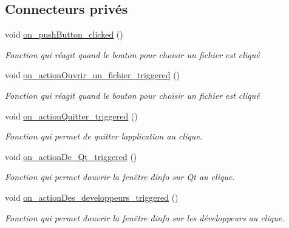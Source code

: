 \subsection*{Connecteurs privés}
\begin{DoxyCompactItemize}
\item 
void \hyperlink{classMainWindowLaunchDialog_a4464510ed5080984f0af0d3c0559f9eb}{on\+\_\+push\+Button\+\_\+clicked} ()
\begin{DoxyCompactList}\small\item\em Fonction qui réagit quand le bouton pour choisir un fichier est cliqué \end{DoxyCompactList}\item 
void \hyperlink{classMainWindowLaunchDialog_a0cfb74c6cb22582d2b1047332008b9c0}{on\+\_\+action\+Ouvrir\+\_\+un\+\_\+fichier\+\_\+triggered} ()
\begin{DoxyCompactList}\small\item\em Fonction qui réagit quand le bouton pour choisir un fichier est cliqué \end{DoxyCompactList}\item 
void \hyperlink{classMainWindowLaunchDialog_aad807a24560cbcb3d864a1c6b678537e}{on\+\_\+action\+Quitter\+\_\+triggered} ()
\begin{DoxyCompactList}\small\item\em Fonction qui permet de quitter l\textquotesingle{}application au clique. \end{DoxyCompactList}\item 
void \hyperlink{classMainWindowLaunchDialog_a91bfa59302a3591b7b3b11b03d6f9b0e}{on\+\_\+action\+De\+\_\+\+Qt\+\_\+triggered} ()
\begin{DoxyCompactList}\small\item\em Fonction qui permet d\textquotesingle{}ouvrir la fenêtre d\textquotesingle{}info sur Qt au clique. \end{DoxyCompactList}\item 
void \hyperlink{classMainWindowLaunchDialog_aaa766b56e4327b3bedf7f88c1b52cee7}{on\+\_\+action\+Des\+\_\+developpeurs\+\_\+triggered} ()
\begin{DoxyCompactList}\small\item\em Fonction qui permet d\textquotesingle{}ouvrir la fenêtre d\textquotesingle{}info sur les développeurs au clique. \end{DoxyCompactList}\end{DoxyCompactItemize}
